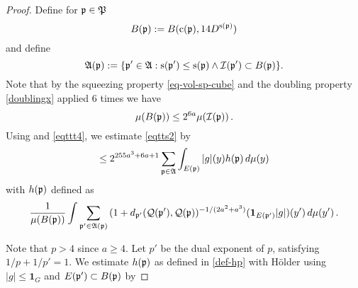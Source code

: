 \begin{proof}
Define for ${\mathfrak p}\in {\mathfrak P}$
\begin{equation}
    B({\mathfrak p}):=B({\mathrm{c}}({\mathfrak p}), 14D^{{\mathrm{s}}({\mathfrak p})})
\end{equation}
and define
\begin{equation}
    \label{eq-Dp-definition}
    \mathfrak{A}({\mathfrak p}):=\{{\mathfrak p}'\in\mathfrak{A}: {\mathrm{s}}({\mathfrak p}')\leq {\mathrm{s}}({\mathfrak p}) \land {\mathcal{I}}({\mathfrak p}') \subset B({\mathfrak p})\}.
\end{equation}
Note that by the squeezing property \eqref{eq-vol-sp-cube}
and the doubling property \eqref{doublingx} applied
$6$ times we have
\begin{equation}\label{eqttt4}
    \mu(B({\mathfrak p}))\le 2^{6a} \mu({\mathcal{I}}({\mathfrak p}))\, .
\end{equation}
Using  and \eqref{eqttt4}, we estimate \eqref{eqtts2} by
\begin{equation}\label{eqtts3}
     \le 2^{255a^3+6a+1} \sum_{{\mathfrak p}\in \mathfrak{A}}
    \int_{E({\mathfrak p})}|g|(y) h({\mathfrak p})\, d\mu(y)
\end{equation}
with $h({\mathfrak p})$ defined as
\begin{equation}\label{def-hp}
    \frac 1{\mu(B({\mathfrak p}))}\int \sum_{{\mathfrak p}'\in \mathfrak{A}({\mathfrak p})}
    {(1+d_{{\mathfrak p}'}({\mathcal{Q}}({\mathfrak p}'), {\mathcal{Q}}({\mathfrak p}))^{-1/(2a^2+a^3)}}(\mathbf{1}_{E({\mathfrak p}')}|g|)(y')\, d\mu(y')\,.
\end{equation}

Note that $p>4$ since $a\ge 4$. Let $p'$ be the dual exponent of $p$, satisfying $1/p+1/p'=1$.
We estimate $h({\mathfrak p})$ as defined in \eqref{def-hp} with H\"older using $|g|\le \mathbf{1}_G$ and $E({\mathfrak p}')\subset B({\mathfrak p})$ by


\end{proof}
